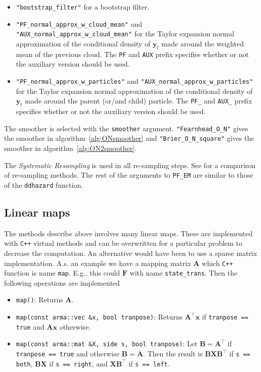 \documentclass[9pt, notitlepage]{article}
\renewcommand{\vec}[1]{\bm{#1}}
\newcommand{\mat}[1]{\mathbf{#1}}
\begin{document}
\begin{itemize}
	\item \verb|"bootstrap_filter"| for a bootstrap filter.
	\item \verb|"PF_normal_approx_w_cloud_mean"| and \verb|"AUX_normal_approx_w_cloud_mean"| for the Taylor expansion normal approximation of the conditional density of $\vec{y}_t$ made around the weighted mean of the previous cloud. The \verb|PF| and \verb|AUX| prefix specifies whether or not the auxiliary version should be used.
	\item \verb|"PF_normal_approx_w_particles"| and \verb|"AUX_normal_approx_w_particles"| for the Taylor expansion normal approximation of the conditional density of $\vec{y}_t$ made around the parent (or/and child) particle. The \verb|PF_| and \verb|AUX_| prefix specifies whether or not the auxiliary version should be used.
\end{itemize}

The smoother is selected with the \verb|smoother| argument. \verb|"Fearnhead_O_N"| gives the smoother in algorithm~\ref{alg:ONsmoother} and \verb|"Brier_O_N_square"| gives the smoother in algorithm~\ref{alg:ON2smoother}.

The \emph{Systematic Resampling} \citep{kitagawa96} is used in all re-sampling steps. See \cite{douc05} for a comparison of re-sampling methods. The rest of the arguments to \verb|PF_EM| are similar to those of the \verb|ddhazard| function.

\subsection{Linear maps}
The methods describe above involves many linear maps. These are implemented with \verb|C++| virtual methods and can be overwritten for a particular problem to decrease the computation. An alternative would have been to use a sparse matrix implementation. A.s. an example we have a mapping matrix $\mat{A}$ which \verb|C++| function is name \verb|map|. E.g., this could $\mat{F}$ with name \verb|state_trans|. Then the following operations are implemented 

\begin{itemize}
\item \verb|map()|: Returns $\mat{A}$.
%
\item \verb|map(const arma::vec &x, bool tranpose)|: Returns $\mat{A}^\top\vec{x}$ if \verb|tranpose == true| and $\mat{A}\vec{x}$ otherwise.
%
\item \verb|map(const arma::mat &X, side s, bool tranpose)|: Let $\mat{B}=\mat{A}^\top$ if  \verb|tranpose == true| and otherwise $\mat{B}=\mat{A}$. Then the result is  $\mat{B}\mat{X}\mat{B}^\top$ if \verb|s == both|, $\mat{B}\mat{X}$ if \verb|s == right|, and $\mat{X}\mat{B}^\top$ if \verb|s == left|.
\end{itemize}
\end{document}
